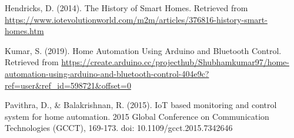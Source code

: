 \documentclass[journal]{IEEEtran}
\begin{document}

%
%
%
\begin{flushleft}
\begin{thebibliography}{1}

Hendricks, D. (2014). The History of Smart Homes. Retrieved from \url{https://www.iotevolutionworld.com/m2m/articles/376816-history-smart-homes.htm}

Kumar, S. (2019). Home Automation Using Arduino and Bluetooth Control. Retrieved from \url{https://create.arduino.cc/projecthub/Shubhamkumar97/home-automation-using-arduino-and-bluetooth-control-404e9c?ref=user&ref_id=598721&offset=0}

Pavithra, D., & Balakrishnan, R. (2015). IoT based monitoring and control system for home automation. 2015 Global Conference on Communication Technologies (GCCT), 169-173. doi: 10.1109/gcct.2015.7342646

\end{thebibliography}
\end{flushleft}

\end{document}
